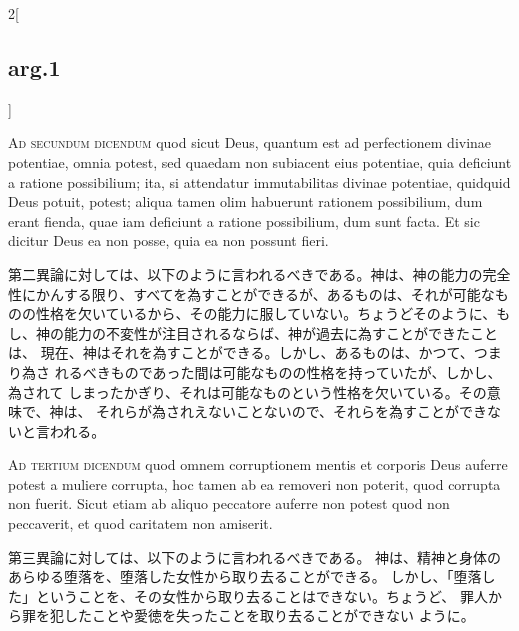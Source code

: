 \documentclass[paper=a4paper,fontsize=10pt,jafontsize=9pt,titlepage]{jlreq}
\begin{document}
\begin{paracol}{2}[\subsection{arg.1}]
\switchcolumn*[\subsection{ad.2}]

{\scshape Ad secundum dicendum} quod sicut Deus, quantum
est ad perfectionem divinae potentiae, omnia potest, sed quaedam non
subiacent eius potentiae, quia deficiunt a ratione possibilium; ita, si
attendatur immutabilitas divinae potentiae, quidquid Deus potuit,
potest; aliqua tamen olim habuerunt rationem possibilium, dum erant
fienda, quae iam deficiunt a ratione possibilium, dum sunt facta. Et sic
dicitur Deus ea non posse, quia ea non possunt fieri.

\switchcolumn

第二異論に対しては、以下のように言われるべきである。神は、神の能力の完全
性にかんする限り、すべてを為すことができるが、あるものは、それが可能なも
のの性格を欠いているから、その能力に服していない。ちょうどそのように、も
し、神の能力の不変性が注目されるならば、神が過去に為すことができたことは、
現在、神はそれを為すことができる。しかし、あるものは、かつて、つまり為さ
れるべきものであった間は可能なものの性格を持っていたが、しかし、為されて
しまったかぎり、それは可能なものという性格を欠いている。その意味で、神は、
それらが為されえないことないので、それらを為すことができないと言われる。

\switchcolumn*[\subsection{ad.3}]

{\scshape Ad tertium dicendum} quod omnem corruptionem
mentis et corporis Deus auferre potest a muliere corrupta, hoc tamen ab
ea removeri non poterit, quod corrupta non fuerit. Sicut etiam ab aliquo
peccatore auferre non potest quod non peccaverit, et quod caritatem non
amiserit.

\switchcolumn

第三異論に対しては、以下のように言われるべきである。
神は、精神と身体のあらゆる堕落を、堕落した女性から取り去ることができる。
 しかし、「堕落した」ということを、その女性から取り去ることはできない。ちょうど、
 罪人から罪を犯したことや愛徳を失ったことを取り去ることができない
 ように。

\end{paracol}
\newpage
{}
{}
\setcounter{section}{5}
\setcounter{subsection}{0}
\end{document}
